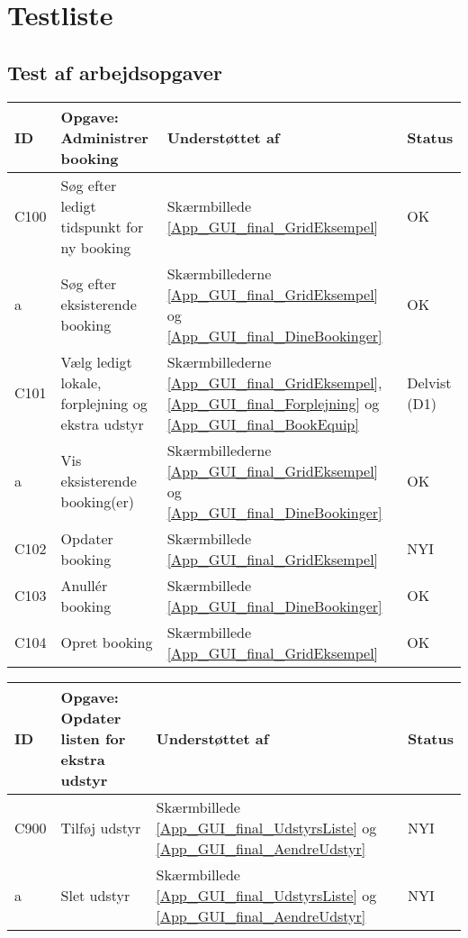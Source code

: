 \section{Testliste}
\label{App_Test_ListOfTest}

\subsection{Test af arbejdsopgaver}
\label{App_Test_ListOfTest_Work}

\begin{longtable}{ |p{0.85cm}| p{7.1cm} | p{5.5cm} | p{2cm} | }
\hline
\textbf{ID} & \textbf{Opgave: Administrer booking} & \textbf{Understøttet af} & \textbf{Status}\\ 
\hline
C100 & Søg efter ledigt tidspunkt for ny booking & Skærmbillede \ref{App_GUI_final_GridEksempel} & OK \\
\hline
a & Søg efter eksisterende booking & Skærmbillederne \ref{App_GUI_final_GridEksempel}  og \ref{App_GUI_final_DineBookinger} & OK \\
\hline
C101 & Vælg ledigt lokale, forplejning og ekstra udstyr & Skærmbillederne \ref{App_GUI_final_GridEksempel}, \ref{App_GUI_final_Forplejning} og \ref{App_GUI_final_BookEquip}  & Delvist (D1) \\
\hline
a & Vis eksisterende booking(er) & Skærmbillederne \ref{App_GUI_final_GridEksempel} og \ref{App_GUI_final_DineBookinger} & OK \\
\hline
C102 & Opdater booking & Skærmbillede \ref{App_GUI_final_GridEksempel} & NYI \\
\hline
C103 & Anullér booking & Skærmbillede \ref{App_GUI_final_DineBookinger} & OK \\
\hline
C104 & Opret booking & Skærmbillede \ref{App_GUI_final_GridEksempel} & OK \\
\hline
\end{longtable}

\begin{longtable}{ |p{0.85cm}| p{7.1cm} | p{5.5cm} | p{2cm} | }
\hline
\textbf{ID} & \textbf{Opgave: Opdater listen for ekstra udstyr} & \textbf{Understøttet af} &\textbf{Status}\\ 
\hline
C900 & Tilføj udstyr & Skærmbillede \ref{App_GUI_final_UdstyrsListe} og \ref{App_GUI_final_AendreUdstyr} & NYI \\
\hline
a & Slet udstyr & Skærmbillede \ref{App_GUI_final_UdstyrsListe} og \ref{App_GUI_final_AendreUdstyr} & NYI \\
\hline
\end{longtable}

